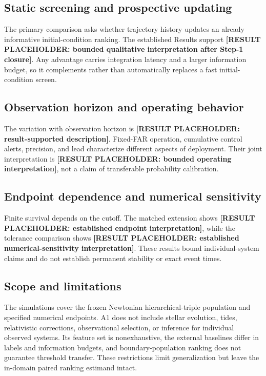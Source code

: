 \documentclass[linenumbers,twocolumn]{aastex702}
\newcommand{\resultplaceholder}[1]{\textbf{[RESULT PLACEHOLDER: #1]}}
\begin{document}
\subsection{Static screening and prospective updating}\label{sec:discussion_update}
The primary comparison asks whether trajectory history updates an already informative initial-condition ranking. The established Results support \resultplaceholder{bounded qualitative interpretation after Step-1 closure}. Any advantage carries integration latency and a larger information budget, so it complements rather than automatically replaces a fast initial-condition screen.

\subsection{Observation horizon and operating behavior}\label{sec:discussion_horizon}
The variation with observation horizon is \resultplaceholder{result-supported description}. Fixed-FAR operation, cumulative control alerts, precision, and lead characterize different aspects of deployment. Their joint interpretation is \resultplaceholder{bounded operating interpretation}, not a claim of transferable probability calibration.

\subsection{Endpoint dependence and numerical sensitivity}\label{sec:discussion_endpoint}
Finite survival depends on the cutoff. The matched extension shows \resultplaceholder{established endpoint interpretation}, while the tolerance comparison shows \resultplaceholder{established numerical-sensitivity interpretation}. These results bound individual-system claims and do not establish permanent stability or exact event times.

\subsection{Scope and limitations}\label{sec:limitations}
The simulations cover the frozen Newtonian hierarchical-triple population and specified numerical endpoints. A1 does not include stellar evolution, tides, relativistic corrections, observational selection, or inference for individual observed systems. Its feature set is nonexhaustive, the external baselines differ in labels and information budgets, and boundary-population ranking does not guarantee threshold transfer. These restrictions limit generalization but leave the in-domain paired ranking estimand intact.
\end{document}
